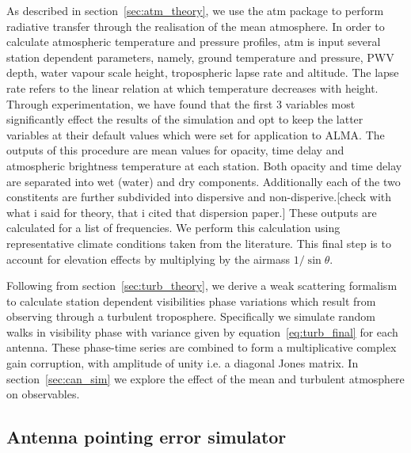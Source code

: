 As described in section~\ref{sec:atm_theory}, we use the {\sc atm} package to perform radiative transfer through the realisation of the mean atmosphere. 
In order to calculate atmospheric temperature and pressure profiles, {\sc atm} is input several station dependent parameters, namely, ground temperature and pressure, PWV depth, water vapour scale height, tropospheric lapse rate  and altitude. The lapse rate refers to the linear relation at which temperature decreases with height. Through experimentation, we have found that the first 3 variables most significantly effect the results of the simulation and opt to keep the latter variables at their default values which were set for application to ALMA. 
The outputs of this procedure are mean values for opacity, time delay and atmospheric brightness temperature at each station. Both opacity and time delay are separated into wet (water) and dry components. Additionally each of the two constitents are further subdivided into dispersive and non-disperive.[check with what i said for theory, that i cited that dispersion paper.] These outputs are calculated for a list of frequencies.
We perform this calculation using representative climate conditions taken from the literature. This final step is to account for elevation effects by multiplying by the airmass $1/\sin\theta$. 

Following from section~\ref{sec:turb_theory}, we derive a weak scattering formalism to calculate station dependent visibilities phase variations which result from observing through a turbulent troposphere. Specifically we simulate random walks in visibility phase with variance given by equation~\ref{eq:turb_final} for each antenna. These phase-time series are combined to form a multiplicative complex gain corruption, with amplitude of unity i.e. a diagonal Jones matrix. In section~\ref{sec:can_sim} we explore the effect of the mean and turbulent atmosphere on observables.

\subsection{Antenna pointing error simulator}\label{sec:point_imp}

